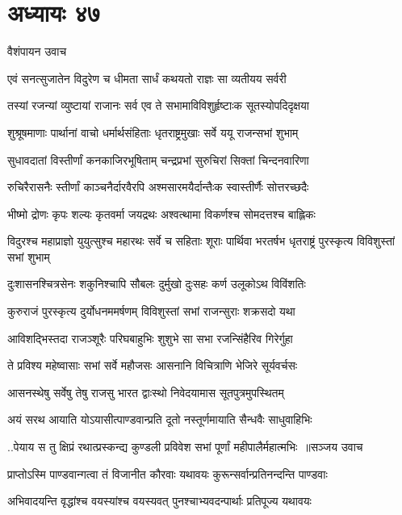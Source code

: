 \chapter{अध्यायः ४७}
\twolineshloka
{वैशंपायन उवाच}
{}


\twolineshloka
{एवं सनत्सुजातेन विदुरेण च धीमता}
{सार्धं कथयतो राज्ञः सा व्यतीयय सर्वरी}


\twolineshloka
{तस्यां रजन्यां व्युष्टायां राजानः सर्व एव ते}
{सभामाविविशुर्हृष्टाःक सूतस्योपदिदृक्षया}


\twolineshloka
{शुश्रूषमाणाः पार्थानां वाचो धर्मार्थसंहिताः}
{धृतराष्ट्रमुखाः सर्वे ययू राजन्सभां शुभाम्}


\twolineshloka
{सुधावदातां विस्तीर्णां कनकाजिरभूषिताम्}
{चन्द्रप्रभां सुरुचिरां सिक्तां चिन्दनवारिणा}


\twolineshloka
{रुचिरैरासनैः स्तीर्णां काञ्चनैर्दारवैरपि}
{अश्मसारमयैर्दान्तैःक स्वास्तीर्णैः सोत्तरच्छदैः}


\threelineshloka
{भीष्मो द्रोणः कृपः शल्यः कृतवर्मा जयद्रथः}
{अश्वत्थामा विकर्णश्च सोमदत्तश्च बाह्लिकः}
{}


\threelineshloka
{विदुरश्च महाप्राज्ञो युयुत्सुश्च महारथः}
{सर्वे च सहिताः शूराः पार्थिवा भरतर्षभ}
{धृतराष्ट्रं पुरस्कृत्य विविशुस्तां सभां शुभाम्}


\twolineshloka
{दुःशासनश्चित्रसेनः शकुनिश्चापि सौबलः}
{दुर्मुखो दुःसहः कर्ण उलूकोऽथ विविंशतिः}


\twolineshloka
{कुरुराजं पुरस्कृत्य दुर्योधनममर्षणम्}
{विविशुस्तां सभां राजन्सुराः शक्रसदो यथा}


\twolineshloka
{आविशद्भिस्तदा राजञ्शूरैः परिघबाहुभिः}
{शुशुभे सा सभा रजन्सिंहैरिव गिरेर्गुहा}


\twolineshloka
{ते प्रविश्य महेष्वासाः सभां सर्वे महौजसः}
{आसनानि विचित्राणि भेजिरे सूर्यवर्चसः}


\twolineshloka
{आसनस्थेषु सर्वेषु तेषु राजसु भारत}
{द्वाःस्थो निवेदयामास सूतपुत्रमुपस्थितम्}


\twolineshloka
{अयं सरथ आयाति योऽयासीत्पाण्डवान्प्रति}
{दूतो नस्तूर्णमायाति सैन्धवैः साधुवाहिभिः}


\threelineshloka
{..पेयाय स तु क्षिप्रं रथात्प्रस्कन्द्य कुण्डली}
{प्रविवेश सभां पूर्णां महीपालैर्महात्मभिः ॥सञ्जय उवाच}
{}


\twolineshloka
{प्राप्तोऽस्मि पाण्डवान्गत्वा तं विजानीत कौरवाः}
{यथावयः कुरून्सर्वान्प्रतिनन्दन्ति पाण्डवाः}


\twolineshloka
{अभिवादयन्ति वृद्धांश्च वयस्यांश्च वयस्यवत्}
{पुनश्चाभ्यवदन्पार्थाः प्रतिपूज्य यथावयः}



